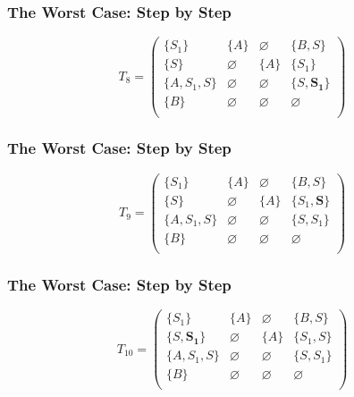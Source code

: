 \documentclass[xcolor=table]{beamer}
\begin{document}
\begin{frame}[noframenumbering]
  \transwipe[direction=90]
  \frametitle{The Worst Case: Step by Step}
\begin{figure}[h]
\[
T_8 = \begin{pmatrix}
\{S_1\}     & \{A\}       & \varnothing & \{B, S\}    \\
\{S\}       & \varnothing & \{A\}       & \{S_1\}     \\
\{A, S_1, S\}  & \varnothing & \varnothing & \{S, \pmb{S_1}\} \\
\{B\}       & \varnothing & \varnothing & \varnothing \\
\end{pmatrix}
\]
\label{ExampleQueryFirstIteration}
\end{figure}
\end{frame} 

\begin{frame}[noframenumbering]
  \transwipe[direction=90]
  \frametitle{The Worst Case: Step by Step}
\begin{figure}[h]
\[
T_9 = \begin{pmatrix}
\{S_1\}     & \{A\}       & \varnothing & \{B, S\}    \\
\{S\}       & \varnothing & \{A\}       & \{S_1, \pmb{S}\}     \\
\{A, S_1, S\}  & \varnothing & \varnothing & \{S, S_1\} \\
\{B\}       & \varnothing & \varnothing & \varnothing \\
\end{pmatrix}
\]
\label{ExampleQueryFirstIteration}
\end{figure}
\end{frame} 

\begin{frame}[noframenumbering]
  \transwipe[direction=90]
  \frametitle{The Worst Case: Step by Step}
\begin{figure}[h]
\[
T_{10} = \begin{pmatrix}
\{S_1\}     & \{A\}       & \varnothing & \{B, S\}    \\
\{S, \pmb{S_1}\}       & \varnothing & \{A\}       & \{S_1, S\}     \\
\{A, S_1, S\}  & \varnothing & \varnothing & \{S, S_1\} \\
\{B\}       & \varnothing & \varnothing & \varnothing \\
\end{pmatrix}
\]
\label{ExampleQueryFirstIteration}
\end{figure}
\end{frame} 
\end{document}
